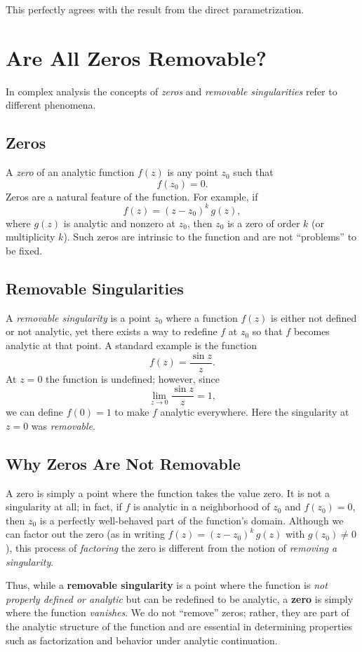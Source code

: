 \documentclass[12pt]{article}
\theoremstyle{definition} %
\theoremstyle{plain} %
\begin{document}
\noindent
This perfectly agrees with the result from the direct parametrization.

\section*{Are All Zeros Removable?}

In complex analysis the concepts of \emph{zeros} and \emph{removable singularities} refer to different phenomena.

\subsection*{Zeros}
A \emph{zero} of an analytic function \(f(z)\) is any point \(z_0\) such that
\[
  f(z_0)=0.
\]
Zeros are a natural feature of the function. For example, if
\[
  f(z)=(z-z_0)^k\,g(z),
\]
where \(g(z)\) is analytic and nonzero at \(z_0\), then \(z_0\) is a zero of order \(k\) (or multiplicity \(k\)). Such zeros are intrinsic to the function and are not “problems” to be fixed.

\subsection*{Removable Singularities}
A \emph{removable singularity} is a point \(z_0\) where a function \(f(z)\) is either not defined or not analytic, yet there exists a way to redefine \(f\) at \(z_0\) so that \(f\) becomes analytic at that point. A standard example is the function
\[
  f(z)=\frac{\sin z}{z}.
\]
At \(z=0\) the function is undefined; however, since
\[
  \lim_{z\to 0}\frac{\sin z}{z}=1,
\]
we can define \(f(0)=1\) to make \(f\) analytic everywhere. Here the singularity at \(z=0\) was \emph{removable}.

\subsection*{Why Zeros Are Not Removable}
A zero is simply a point where the function takes the value zero. It is not a singularity at all; in fact, if \(f\) is analytic in a neighborhood of \(z_0\) and \(f(z_0)=0\), then \(z_0\) is a perfectly well-behaved part of the function's domain. Although we can factor out the zero (as in writing \(f(z)=(z-z_0)^k\,g(z)\) with \(g(z_0)\neq 0\)), this process of \emph{factoring} the zero is different from the notion of \emph{removing a singularity}.

Thus, while a \textbf{removable singularity} is a point where the function is \emph{not properly defined or analytic} but can be redefined to be analytic, a \textbf{zero} is simply where the function \emph{vanishes}. We do not “remove” zeros; rather, they are part of the analytic structure of the function and are essential in determining properties such as factorization and behavior under analytic continuation.
\end{document}
